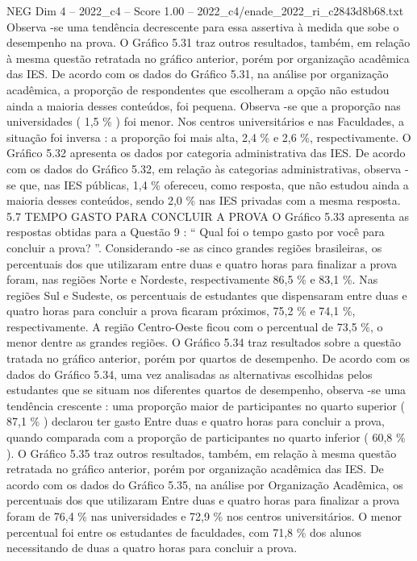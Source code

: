 \begin{textsample}{NEG Dim 4 – 2022\_c4 – Score 1.00 – 2022\_c4/enade\_2022\_ri\_c2843d8b68.txt}
Observa -se uma tendência decrescente para essa assertiva à medida que sobe o desempenho na prova.
O Gráfico 5.31 traz outros resultados, também, em relação à mesma questão retratada no gráfico anterior, porém por organização acadêmica das IES.
De acordo com os dados do Gráfico 5.31, na análise por organização acadêmica, a proporção de respondentes que escolheram a opção não estudou ainda a maioria desses conteúdos, foi pequena.
Observa -se que a proporção nas universidades ( 1,5 \% ) foi menor.
Nos centros universitários e nas Faculdades, a situação foi inversa : a proporção foi mais alta, 2,4 \% e 2,6 \%, respectivamente.
O Gráfico 5.32 apresenta os dados por categoria administrativa das IES.
De acordo com os dados do Gráfico 5.32, em relação às categorias administrativas, observa -se que, nas IES públicas, 1,4 \% ofereceu, como resposta, que não estudou ainda a maioria desses conteúdos, sendo 2,0 \% nas IES privadas com a mesma resposta. 5.7 TEMPO GASTO PARA CONCLUIR A PROVA O Gráfico 5.33 apresenta as respostas obtidas para a Questão 9 : “ Qual foi o tempo gasto por você para concluir a prova? ”.
Considerando -se as cinco grandes regiões brasileiras, os percentuais dos que utilizaram entre duas e quatro horas para finalizar a prova foram, nas regiões Norte e Nordeste, respectivamente 86,5 \% e 83,1 \%.
Nas regiões Sul e Sudeste, os percentuais de estudantes que dispensaram entre duas e quatro horas para concluir a prova ficaram próximos, 75,2 \% e 74,1 \%, respectivamente.
A região Centro-Oeste ficou com o percentual de 73,5 \%, o menor dentre as grandes regiões.
O Gráfico 5.34 traz resultados sobre a questão tratada no gráfico anterior, porém por quartos de desempenho.
De acordo com os dados do Gráfico 5.34, uma vez analisadas as alternativas escolhidas pelos estudantes que se situam nos diferentes quartos de desempenho, observa -se uma tendência crescente : uma proporção maior de participantes no quarto superior ( 87,1 \% ) declarou ter gasto Entre duas e quatro horas para concluir a prova, quando comparada com a proporção de participantes no quarto inferior ( 60,8 \% ).
O Gráfico 5.35 traz outros resultados, também, em relação à mesma questão retratada no gráfico anterior, porém por organização acadêmica das IES.
De acordo com os dados do Gráfico 5.35, na análise por Organização Acadêmica, os percentuais dos que utilizaram Entre duas e quatro horas para finalizar a prova foram de 76,4 \% nas universidades e 72,9 \% nos centros universitários.
O menor percentual foi entre os estudantes de faculdades, com 71,8 \% dos alunos necessitando de duas a quatro horas para concluir a prova.

\end{textsample}
